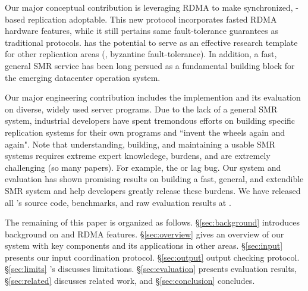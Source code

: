 Our major conceptual contribution is leveraging RDMA to make synchronized, 
\paxos-based replication adoptable. This new protocol incorporates fasted RDMA 
hardware features, while it still pertains same fault-tolerance guarantees as 
traditional \paxos protocols. \xxx has the potential to serve as an effective 
research template for other replication areas (\eg, byzantine fault-tolerance). 
In addition, a fast, general SMR service has been long persued as a fundamental 
building block for the emerging datacenter operation system.

Our major engineering contribution includes the \xxx implemention and its 
evaluation on \nprog diverse, widely used server programs. Due to the lack of a 
general SMR system, industrial developers have spent tremondous efforts on 
building specific replication systems for their own programs and ``invent the 
wheels again and again". Note that understanding, building, and maintaining a 
usable SMR systems requires extreme expert knowledege, burdens, and are 
extremely challenging (so many \paxos papers). For example, the \redis or 
\memcached lag bug. Our \xxx system and evaluation has shown promising results 
on building a fast, general, and extendible SMR system and help developers 
greatly release these burdens. We have released all \xxx's source code, 
benchmarks, and raw evaluation results at \github.

The remaining of this paper is organized as follows. \S\ref{sec:background} 
introduces background on \paxos and RDMA features. \S\ref{sec:overview} gives 
an overview of our \xxx system with key components and its applications in 
other areas. \S\ref{sec:input} presents our input coordination protocol. 
\S\ref{sec:output} output checking protocol. \S\ref{sec:limits} \xxx's 
discusses limitations. \S\ref{sec:evaluation} presents evaluation results, 
\S\ref{sec:related} discusses related work, and \S\ref{sec:conclusion} 
concludes.   